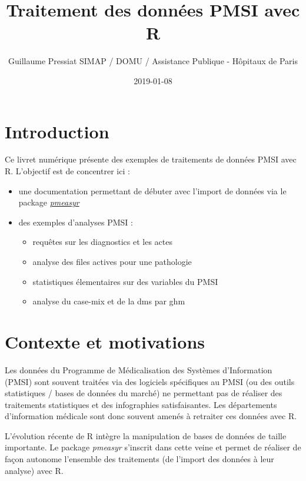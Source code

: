 \documentclass[]{book}
\title{Traitement des données PMSI avec R}
\author{Guillaume Pressiat \textbar{}\textbar{} SIMAP / DOMU / Assistance Publique - Hôpitaux de Paris}
\date{2019-01-08}
\providecommand{\tightlist}{%
  \setlength{\itemsep}{0pt}\setlength{\parskip}{0pt}}
\begin{document}
\maketitle

{
\setcounter{tocdepth}{1}
\tableofcontents
}
\hypertarget{introduction}{%
\chapter{Introduction}\label{introduction}}

Ce livret numérique présente des exemples de traitements de données PMSI avec R. L'objectif est de concentrer ici :

\begin{itemize}
\item
  une documentation permettant de débuter avec l'import de données via le package \href{https://github.com/IM-APHP/pmeasyr}{\emph{pmeasyr}}
\item
  des exemples d'analyses PMSI :

  \begin{itemize}
  \tightlist
  \item
    requêtes sur les diagnostics et les actes
  \item
    analyse des files actives pour une pathologie
  \item
    statistiques élementaires sur des variables du PMSI
  \item
    analyse du case-mix et de la dms par ghm
  \end{itemize}
\end{itemize}

\hypertarget{contexte}{%
\chapter{Contexte et motivations}\label{contexte}}

Les données du Programme de Médicalisation des Systèmes d'Information (PMSI) sont souvent traitées via des logiciels spécifiques au PMSI (ou des outils statistiques / bases de données du marché) ne permettant pas de réaliser des traitements statistiques et des infographies satisfaisantes. Les départements d'information médicale sont donc souvent amenés à retraiter ces données avec R.

L'évolution récente de R intègre la manipulation de bases de données de taille importante. Le package \emph{pmeasyr} s'inscrit dans cette veine et permet de réaliser de façon autonome l'ensemble des traitements (de l'import des données à leur analyse) avec R.
\end{document}
